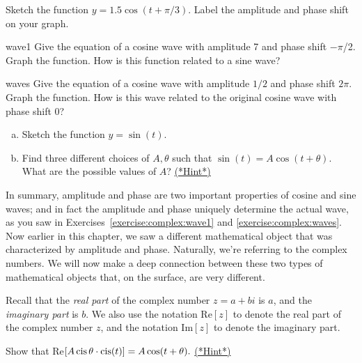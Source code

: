 \begin{exercise}{41}
Sketch the function $y = 1.5 \cos(t + \pi/3)$. Label the amplitude and phase shift on your graph.
\end{exercise}

\begin{exercise}{wave1}
Give the equation of a cosine wave with amplitude 7 and phase shift $-\pi$/2. Graph the function. How is this function related to a sine wave?
\end{exercise}

\begin{exercise}{waves}
Give the equation of a cosine wave with amplitude $1/2$ and phase shift $2\pi$. Graph the function. How is this wave related to the original cosine wave with phase shift 0?
\end{exercise}

\begin{exercise}{42}
\begin{enumerate}[(a)]
\item
Sketch the function $y = \sin(t)$.
\item
Find three different  choices of $A,\theta$ such that 
$ \sin(t) = A  \cos (t + \theta)$.  What are the possible values of $A$?
\hyperref[sec:complex:hints]{(*Hint*)}

\end{enumerate}
\end{exercise}

\noindent
In summary, amplitude and phase are two important properties of cosine and sine waves; and in fact the amplitude and phase uniquely determine the actual wave, as you saw in Exercises~\ref{exercise:complex:wave1} and \ref{exercise:complex:waves}. Now earlier in this chapter, we saw a different mathematical object that was characterized by amplitude and phase. Naturally, we're referring to the complex numbers.  We will now make a deep connection between these two types of mathematical objects that, on the surface, are very different.

Recall that the \emph{real part} of the complex number $z = a + bi$ is $a$, and the \emph{imaginary part} is $b$. We also use the notation Re$[z]$ to denote the real part of the complex number $z$, and the notation Im$[z]$ to denote the imaginary part.

\begin{exercise}{43}
Show that Re$ [A  \operatorname{cis}\theta \cdot \operatorname{cis}( t)]  = A  \cos ( t +  \theta). $
\hyperref[sec:complex:hints]{(*Hint*)}
 \end{exercise}

